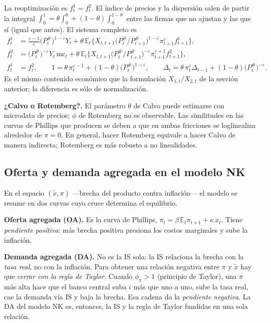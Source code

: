 \documentclass[11pt]{article}
\newenvironment{notabox}[1][Nota]%
  {\par\medskip\noindent\textbf{#1.}\enspace\ignorespaces}%
  {\par\medskip}
\theoremstyle{definition}
\newcommand{\E}{\mathbb{E}}
\newcommand{\mc}{\mathrm{mc}}
\begin{document}
La reoptimización es $f^{1}_{t}=f^{2}_{t}$. El índice de precios y la dispersión salen de partir la
integral $\int_{0}^{1}=\theta\int_{0}^{\theta}+(1-\theta)\int_{0}^{1-\theta}$ entre las firmas que no
ajustan y las que sí (igual que antes). El sistema completo es
\begin{align}
f^{1}_{t}&=\frac{\varepsilon-1}{\varepsilon}\big(P_{t}^{\#}\big)^{1-\varepsilon}Y_{t}
+\theta\,\E_{t}\big\{X_{t,t+1}\big(P_{t}^{\#}/P_{t+1}^{\#}\big)^{1-\varepsilon}\pi_{t+1}^{\varepsilon}f^{1}_{t+1}\big\},\\
f^{2}_{t}&=\big(P_{t}^{\#}\big)^{-\varepsilon}Y_{t}\,\mc_{t}
+\theta\,\E_{t}\big\{X_{t,t+1}\big(P_{t}^{\#}/P_{t+1}^{\#}\big)^{-\varepsilon}\pi_{t+1}^{\varepsilon+1}f^{2}_{t+1}\big\},\\
f^{1}_{t}&=f^{2}_{t},\qquad
1=\theta\,\pi_{t}^{\varepsilon-1}+(1-\theta)\big(P_{t}^{\#}\big)^{1-\varepsilon},\qquad
\Delta_{t}=\theta\,\pi_{t}^{\varepsilon}\Delta_{t-1}+(1-\theta)\big(P_{t}^{\#}\big)^{-\varepsilon}.
\end{align}
Es el mismo contenido económico que la formulación $X_{1,t}/X_{2,t}$ de la sección anterior; la
diferencia es sólo de normalización.

\begin{notabox}[¿Calvo o Rotemberg?]
El parámetro $\theta$ de Calvo puede estimarse con microdata de precios; $\phi$ de Rotemberg no es
observable. Las similitudes en las curvas de Phillips que producen se deben a que en ambas fricciones
se loglinealiza alrededor de $\pi=0$. En general, hacer Rotemberg equivale a hacer Calvo de manera
indirecta; Rotemberg es más robusto a no linealidades.
\end{notabox}

\subsection{Oferta y demanda agregada en el modelo NK}

En el espacio $(\tilde{x},\pi)$ ---brecha del producto contra inflación--- el modelo se resume en dos
curvas cuyo cruce determina el equilibrio.

\textbf{Oferta agregada (OA).} Es la curva de Phillips,
$\pi_{t}=\beta\,\E_{t}\pi_{t+1}+\kappa\,x_{t}$. Tiene \emph{pendiente positiva}: más brecha positiva
presiona los costos marginales y sube la inflación.

\textbf{Demanda agregada (DA).} No es la IS sola: la IS relaciona la brecha con la \emph{tasa real},
no con la inflación. Para obtener una relación negativa entre $\pi$ y $\tilde{x}$ hay que \emph{cerrar
con la regla de Taylor}. Cuando $\phi_{\pi}>1$ (principio de Taylor), una $\pi$ más alta hace que el
banco central suba $i$ más que uno a uno, sube la tasa real, cae la demanda vía IS y baja la brecha.
Esa cadena da la \emph{pendiente negativa}. La DA del modelo NK es, entonces, la IS y la regla de
Taylor fundidas en una sola relación.
\end{document}

